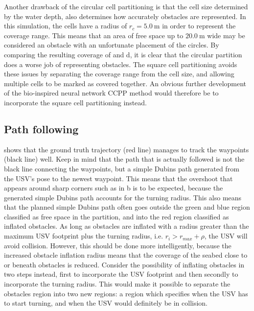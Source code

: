 Another drawback of the circular cell partitioning is that the cell size determined by the water depth, also determines how accurately obstacles are represented. In this simulation, the cells have a radius of $r_c = \SI{5.0}{\meter}$ in order to represent the coverage range. This means that an area of free space up to $\SI{20.0}{\meter}$ wide may be considered an obstacle with an unfortunate placement of the circles. By comparing the resulting coverage of  and d, it is clear that the circular partition does a worse job of representing obstacles. The square cell partitioning avoids these issues by separating the coverage range from the cell size, and allowing multiple cells to be marked as covered together. An obvious further development of the bio-inspired neural network CCPP method would therefore be to incorporate the square cell partitioning instead.

\subsection{Path following}

 shows that the ground truth trajectory (red line) manages to track the waypoints (black line) well. Keep in mind that the path that is actually followed is not the black line connecting the waypoints, but a simple Dubins path generated from the USV's pose to the newest waypoint. This means that the overshoot that appears around sharp corners such as in b is to be expected, because the generated simple Dubins path accounts for the turning radius. This also means that the planned simple Dubins path often goes outside the green and blue region classified as free space in the partition, and into the red region classified as inflated obstacles. As long as obstacles are inflated with a radius greater than the maximum USV footprint plus the turning radius, i.e. $r_i > r_{max} + \rho$, the USV will avoid collision. However, this should be done more intelligently, because the increased obstacle inflation radius means that the coverage of the seabed close to or beneath obstacles is reduced. Consider the possibility of inflating obstacles in two steps instead, first to incorporate the USV footprint and then secondly to incorporate the turning radius. This would make it possible to separate the obstacles region into two new regions: a region which specifies when the USV has to start turning, and when the USV would definitely be in collision.

